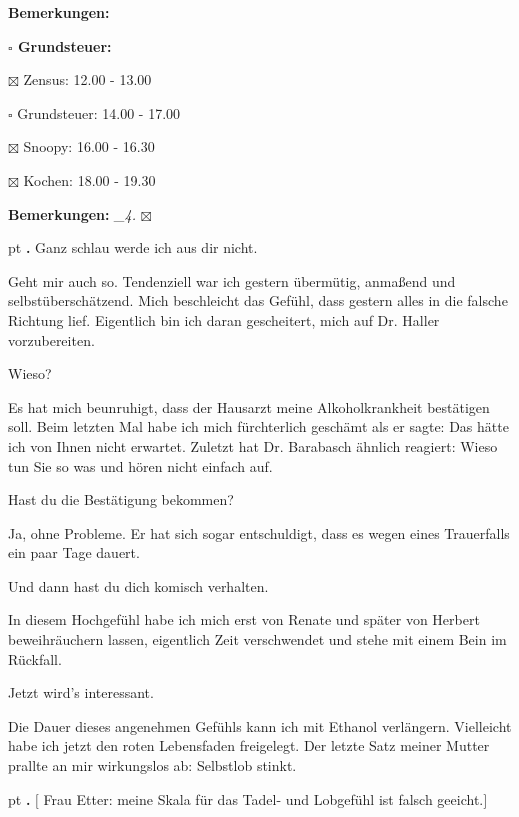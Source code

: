 \documentclass[10pt,a4paper]{article}
\newcounter{notec}
\newcommand\notep[1]{%
  \stepcounter{notec}
  \vskip #1pt
  {\bf\arabic{notec}.}
}
\newcommand\prop[1] {{\color {alizarin} {\bf #1}}}        %
\newcommand\mand[1] {{\color {burntorange} {\bf #1}}}     %
\newcommand\bottomspace{\vskip 4pt}
\newcommand\n[1] { {\sl #1.} \hskip 5pt }
\begin{document}
\begin{mdframed}[style=daystyle]
\begin{labeling}{{\mand {Bemerkungen:}}}
\begin{minipage}{0.75\textwidth}
\begin{labeling}{\prop {$\square$ {Grundsteuer:}}}
      \item[$\boxtimes$ Zensus:]    12.00 - 13.00
      \item[$\square$ Grundsteuer:] 14.00 - 17.00
      \item[$\boxtimes$ Snoopy:]    16.00 - 16.30        
      \item[$\boxtimes$ Kochen:]    18.00 - 19.30
      \end{labeling}
    \end{minipage}
    \bottomspace
  \item[{\mand {Bemerkungen:}}]   \n{\_4} $\boxtimes$
  \end{labeling}
    
  \setcounter{notec}{0}

  \notep 0 Ganz schlau werde ich aus dir nicht.

  \vskip 2pt
  Geht mir auch so. Tendenziell war ich gestern übermütig, anmaßend und
  selbstüberschätzend. Mich beschleicht das Gefühl, dass gestern alles in die
  falsche Richtung lief. Eigentlich bin ich daran gescheitert, mich auf Dr.
  Haller vorzubereiten.

  \vskip 2pt
  Wieso?

  \vskip 2pt
  Es hat mich beunruhigt, dass der Hausarzt meine Alkoholkrankheit bestätigen
  soll. Beim letzten Mal habe ich mich fürchterlich geschämt als er sagte: Das
  hätte ich von Ihnen nicht erwartet. Zuletzt hat Dr. Barabasch ähnlich
  reagiert: Wieso tun Sie so was und hören nicht einfach auf.

  \vskip 2pt
  Hast du die Bestätigung bekommen?

  \vskip 2pt
  Ja, ohne Probleme. Er hat sich sogar entschuldigt, dass es wegen eines
  Trauerfalls ein paar Tage dauert.

  \vskip 2pt
  Und dann hast du dich komisch verhalten.
  
  \vskip 2pt
  In diesem Hochgefühl habe ich mich erst von Renate und später von Herbert
  beweihräuchern lassen, eigentlich Zeit verschwendet und stehe mit einem Bein
  im Rückfall.

  \vskip 2pt
  Jetzt wird’s interessant.

  \vskip 2pt
  Die Dauer dieses angenehmen Gefühls kann ich mit Ethanol verlängern.
  Vielleicht habe ich jetzt den roten Lebensfaden freigelegt. Der letzte Satz
  meiner Mutter prallte an mir wirkungslos ab: Selbstlob stinkt.

  \notep 4 $[$ Frau Etter: meine Skala für das Tadel- und Lobgefühl ist falsch
    geeicht.$]$


\end{mdframed}
\end{document}

